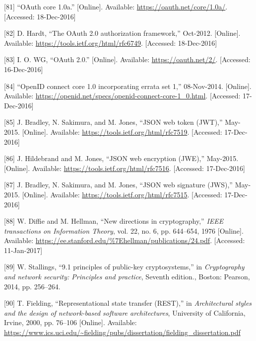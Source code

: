\documentclass[12pt,english,a4paper,titlepage,cleardoublepage=empty,dottedtoc]{report}
\begin{document}
\hypertarget{ref-web_spec_oauth-1a}{}
{[}81{]} ``OAuth core 1.0a.'' {[}Online{]}. Available:
\url{https://oauth.net/core/1.0a/}. {[}Accessed: 18-Dec-2016{]}

\hypertarget{ref-web_spec_oauth-2}{}
{[}82{]} D. Hardt, ``The OAuth 2.0 authorization framework,'' Oct-2012.
{[}Online{]}. Available: \url{https://tools.ietf.org/html/rfc6749}.
{[}Accessed: 18-Dec-2016{]}

\hypertarget{ref-web_2016_oauth-2}{}
{[}83{]} I. O. WG, ``OAuth 2.0.'' {[}Online{]}. Available:
\url{https://oauth.net/2/}. {[}Accessed: 16-Dec-2016{]}

\hypertarget{ref-web_spec_openid-connect-1}{}
{[}84{]} ``OpenID connect core 1.0 incorporating errata set 1,''
08-Nov-2014. {[}Online{]}. Available:
\url{https://openid.net/specs/openid-connect-core-1_0.html}.
{[}Accessed: 17-Dec-2016{]}

\hypertarget{ref-web_spec_json-web-token}{}
{[}85{]} J. Bradley, N. Sakimura, and M. Jones, ``JSON web token
(JWT),'' May-2015. {[}Online{]}. Available:
\url{https://tools.ietf.org/html/rfc7519}. {[}Accessed: 17-Dec-2016{]}

\hypertarget{ref-web_spec_json-web-encryption}{}
{[}86{]} J. Hildebrand and M. Jones, ``JSON web encryption (JWE),''
May-2015. {[}Online{]}. Available:
\url{https://tools.ietf.org/html/rfc7516}. {[}Accessed: 17-Dec-2016{]}

\hypertarget{ref-web_spec_json-web-signature}{}
{[}87{]} J. Bradley, N. Sakimura, and M. Jones, ``JSON web signature
(JWS),'' May-2015. {[}Online{]}. Available:
\url{https://tools.ietf.org/html/rfc7515}. {[}Accessed: 17-Dec-2016{]}

\hypertarget{ref-paper_1976_d-h-key-exchange}{}
{[}88{]} W. Diffie and M. Hellman, ``New directions in cryptography,''
\emph{IEEE transactions on Information Theory}, vol. 22, no. 6, pp.
644--654, 1976 {[}Online{]}. Available:
\url{https://ee.stanford.edu/\%7Ehellman/publications/24.pdf}.
{[}Accessed: 11-Jan-2017{]}

\hypertarget{ref-book_2014_chapter-9-1-public-key-crypto}{}
{[}89{]} W. Stallings, ``9.1 principles of public-key cryptosystems,''
in \emph{Cryptography and network security: Principles and practice},
Seventh edition., Boston: Pearson, 2014, pp. 256--264.

\hypertarget{ref-web_spec_rest}{}
{[}90{]} T. Fielding, ``Representational state transfer (REST),'' in
\emph{Architectural styles and the design of network-based software
architectures}, University of California, Irvine, 2000, pp. 76--106
{[}Online{]}. Available:
\url{https://www.ics.uci.edu/~fielding/pubs/dissertation/fielding_dissertation.pdf}
\end{document}
